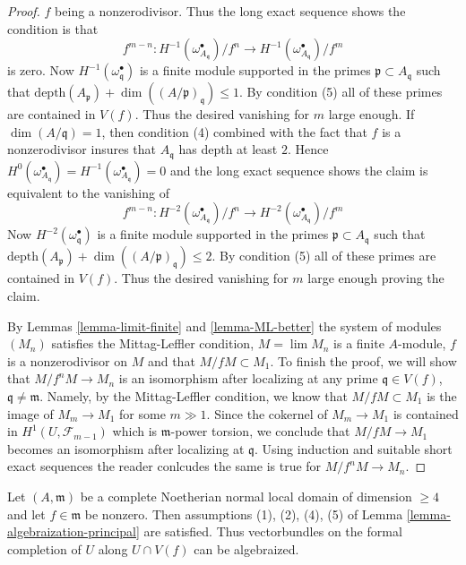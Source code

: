 \begin{proof}
$f$ being a nonzerodivisor.
Thus the long exact sequence shows the condition is that
$$
f^{m - n} :
H^{-1}(\omega_{A_\mathfrak q}^\bullet)/f^n \to
H^{-1}(\omega_{A_\mathfrak q}^\bullet)/f^m
$$
is zero. Now $H^{-1}(\omega^\bullet_\mathfrak q)$ is a finite
module supported in the primes $\mathfrak p \subset A_\mathfrak q$
such that $\text{depth}(A_\mathfrak p) + \dim((A/\mathfrak p)_\mathfrak q)
\leq 1$. By condition (5) all of these primes are contained in $V(f)$.
Thus the desired vanishing for $m$ large enough.
If $\dim(A/\mathfrak q) = 1$, then condition (4) combined
with the fact that $f$ is a nonzerodivisor
insures that $A_\mathfrak q$ has depth at least $2$. Hence
$H^0(\omega_{A_\mathfrak q}^\bullet) =
H^{-1}(\omega_{A_\mathfrak q}^\bullet) = 0$
and the long exact sequence shows the claim is
equivalent to the vanishing of
$$
f^{m - n} :
H^{-2}(\omega_{A_\mathfrak q}^\bullet)/f^n \to
H^{-2}(\omega_{A_\mathfrak q}^\bullet)/f^m
$$
Now $H^{-2}(\omega^\bullet_\mathfrak q)$ is a finite
module supported in the primes $\mathfrak p \subset A_\mathfrak q$
such that $\text{depth}(A_\mathfrak p) + \dim((A/\mathfrak p)_\mathfrak q)
\leq 2$. By condition (5) all of these primes are contained in $V(f)$.
Thus the desired vanishing for $m$ large enough proving the claim.

\medskip\noindent
By Lemmas \ref{lemma-limit-finite} and \ref{lemma-ML-better} 
the system of modules $(M_n)$ satisfies the Mittag-Leffler
condition, $M = \lim M_n$ is a finite $A$-module, $f$ is a
nonzerodivisor on $M$ and that $M/fM \subset M_1$. To finish the proof,
we will show that $M/f^nM \to M_n$ is an isomorphism after
localizing at any prime $\mathfrak q \in V(f)$,
$\mathfrak q \not = \mathfrak m$. Namely, by the Mittag-Leffler
condition, we know that $M/fM \subset M_1$ is the image of
$M_m \to M_1$ for some $m \gg 1$. Since the cokernel of
$M_m \to M_1$ is contained in $H^1(U, \mathcal{F}_{m -  1})$
which is $\mathfrak m$-power torsion, we conclude that
$M/fM \to M_1$ becomes an isomorphism after localizing at $\mathfrak q$.
Using induction and suitable short exact sequences the reader
conlcudes the same is true for $M/f^n M \to M_n$.
\end{proof}

\begin{remark}
\label{remark-interesting-case}
Let $(A, \mathfrak m)$ be a complete Noetherian normal local domain
of dimension $\geq 4$ and let $f \in \mathfrak m$ be nonzero.
Then assumptions (1), (2), (4), (5) of
Lemma \ref{lemma-algebraization-principal}
are satisfied. Thus vectorbundles
on the formal completion of $U$ along $U \cap V(f)$
can be algebraized.
\end{remark}

